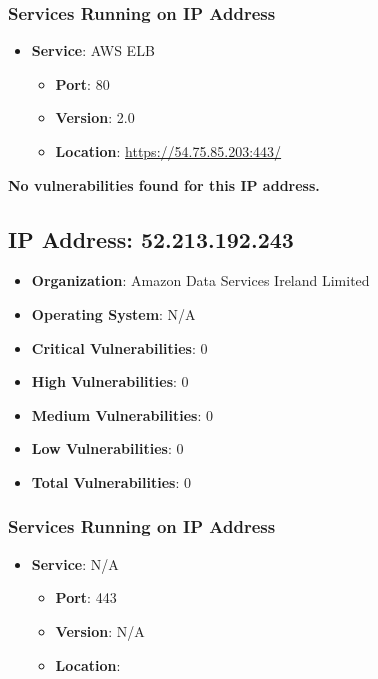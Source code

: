 \documentclass{article}
\begin{document}
\subsubsection*{Services Running on IP Address}

\begin{itemize}
    
        \item \textbf{Service}: AWS ELB
        \begin{itemize}
            \item \textbf{Port}: 80
            \item \textbf{Version}:  2.0 
            \item \textbf{Location}: \href{ https://54.75.85.203:443/ }{ https://54.75.85.203:443/ }
        \end{itemize}
    
\end{itemize}


\textbf{No vulnerabilities found for this IP address.}




\clearpage



\subsection{IP Address: 52.213.192.243}

\begin{itemize}
    \item \textbf{Organization}: Amazon Data Services Ireland Limited
    \item \textbf{Operating System}:  N/A 
    \item \textbf{Critical Vulnerabilities}: 0
    \item \textbf{High Vulnerabilities}: 0
    \item \textbf{Medium Vulnerabilities}: 0
    \item \textbf{Low Vulnerabilities}: 0
    \item \textbf{Total Vulnerabilities}: 0
\end{itemize}

\subsubsection*{Services Running on IP Address}

\begin{itemize}
    
        \item \textbf{Service}: N/A
        \begin{itemize}
            \item \textbf{Port}: 443
            \item \textbf{Version}:  N/A 
            \item \textbf{Location}: \href{  }{  }
        \end{itemize}
    
\end{itemize}
\end{document}
